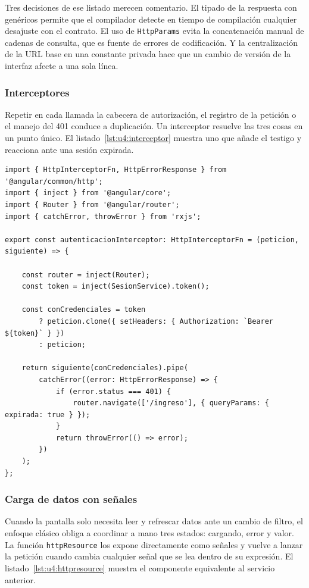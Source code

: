 \documentclass[11pt,a4paper,openany]{book}
\begin{document}
Tres decisiones de ese listado merecen comentario. El tipado de la respuesta con genéricos permite que el compilador detecte en tiempo de compilación cualquier desajuste con el contrato. El uso de \texttt{HttpParams} evita la concatenación manual de cadenas de consulta, que es fuente de errores de codificación. Y la centralización de la URL base en una constante privada hace que un cambio de versión de la interfaz afecte a una sola línea.

\subsubsection{Interceptores}

Repetir en cada llamada la cabecera de autorización, el registro de la petición o el manejo del 401 conduce a duplicación. Un interceptor resuelve las tres cosas en un punto único. El listado~\ref{lst:u4:interceptor} muestra uno que añade el testigo y reacciona ante una sesión expirada.

\begin{lstlisting}[style=ts,caption={Interceptor funcional que anade el testigo y reacciona ante 401.},label={lst:u4:interceptor}]
import { HttpInterceptorFn, HttpErrorResponse } from '@angular/common/http';
import { inject } from '@angular/core';
import { Router } from '@angular/router';
import { catchError, throwError } from 'rxjs';

export const autenticacionInterceptor: HttpInterceptorFn = (peticion, siguiente) => {

	const router = inject(Router);
	const token = inject(SesionService).token();

	const conCredenciales = token
		? peticion.clone({ setHeaders: { Authorization: `Bearer ${token}` } })
		: peticion;

	return siguiente(conCredenciales).pipe(
		catchError((error: HttpErrorResponse) => {
			if (error.status === 401) {
				router.navigate(['/ingreso'], { queryParams: { expirada: true } });
			}
			return throwError(() => error);
		})
	);
};
\end{lstlisting}

\subsubsection{Carga de datos con señales}

Cuando la pantalla solo necesita leer y refrescar datos ante un cambio de filtro, el enfoque clásico obliga a coordinar a mano tres estados: cargando, error y valor. La función \texttt{httpResource} los expone directamente como señales y vuelve a lanzar la petición cuando cambia cualquier señal que se lea dentro de su expresión. El listado~\ref{lst:u4:httpresource} muestra el componente equivalente al servicio anterior.
\end{document}
